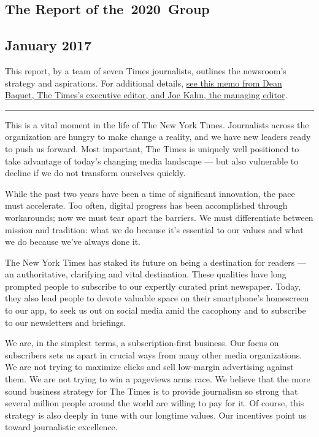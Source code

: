 \hypertarget{the-report-of-the-2020-group}{%
\subsection{The Report of
the~2020~Group}\label{the-report-of-the-2020-group}}

\hypertarget{january-2017}{%
\subsection{January 2017}\label{january-2017}}

\texttt{} \texttt{}

This report, by a team of seven Times journalists, outlines the
newsroom's strategy and aspirations. For additional details,
\href{http://www.nytco.com/from-dean-and-joe-the-year-ahead}{see this
memo from Dean Baquet, The Times's executive editor, and Joe Kahn, the
managing editor}.

\begin{center}\rule{0.5\linewidth}{\linethickness}\end{center}

This is a vital moment in the life of The New York Times. Journalists
across the organization are hungry to make change a reality, and we have
new leaders ready to push us forward. Most important, The Times is
uniquely well positioned to take advantage of today's changing media
landscape --- but also vulnerable to decline if we do not transform
ourselves quickly.

While the past two years have been a time of significant innovation, the
pace must accelerate. Too often, digital progress has been accomplished
through workarounds; now we must tear apart the barriers. We must
differentiate between mission and tradition: what we do because it's
essential to our values and what we do because we've always done it.

The New York Times has staked its future on being a destination for
readers --- an authoritative, clarifying and vital destination. These
qualities have long prompted people to subscribe to our expertly curated
print newspaper. Today, they also lead people to devote valuable space
on their smartphone's homescreen to our app, to seek us out on social
media amid the cacophony and to subscribe to our newsletters and
briefings.

We are, in the simplest terms, a subscription-first business. Our focus
on subscribers sets us apart in crucial ways from many other media
organizations. We are not trying to maximize clicks and sell low-margin
advertising against them. We are not trying to win a pageviews arms
race. We believe that the more sound business strategy for The Times is
to provide journalism so strong that several million people around the
world are willing to pay for it. Of course, this strategy is also deeply
in tune with our longtime values. Our incentives point us toward
journalistic excellence.

